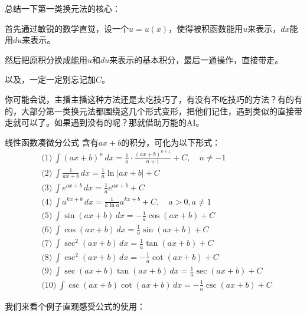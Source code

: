总结一下第一类换元法的核心：

首先通过敏锐的数学直觉，设一个$u=u(x)$，使得被积函数能用$u$来表示，$dx$能用$du$来表示。

然后把原积分换成能用$u$和$du$来表示的基本积分，最后一通操作，直接带走。

以及，一定一定别忘记加$C$。

你可能会说，主播主播这种方法还是太吃技巧了，有没有不吃技巧的方法？有的有的，大部分第一类换元法都围绕这几个形式变形，把他们记住，遇到类似的直接带走就可以了。如果遇到没有的呢？那就借助万能的AI。

\begin{theorem}{线性函数凑微分公式}{}
  含有$ax+b$的积分，可化为以下形式：
\[
\begin{aligned}
&\text{(1)}\ \int (ax+b)^n \,dx = \frac{1}{a}\cdot\frac{(ax+b)^{n+1}}{n+1}+C, \quad n\neq -1 \\[4pt]
&\text{(2)}\ \int \frac{1}{ax+b} \,dx = \frac{1}{a}\ln|ax+b|+C \\[4pt]
&\text{(3)}\ \int e^{ax+b} \,dx = \frac{1}{a}e^{ax+b}+C \\[4pt]
&\text{(4)}\ \int a^{kx+b} \,dx = \frac{1}{k\ln a}a^{kx+b}+C, \quad a>0,a\neq1 \\[4pt]
&\text{(5)}\ \int \sin(ax+b) \,dx = -\frac{1}{a}\cos(ax+b)+C \\[4pt]
&\text{(6)}\ \int \cos(ax+b) \,dx = \frac{1}{a}\sin(ax+b)+C \\[4pt]
&\text{(7)}\ \int \sec^2(ax+b) \,dx = \frac{1}{a}\tan(ax+b)+C \\[4pt]
&\text{(8)}\ \int \csc^2(ax+b) \,dx = -\frac{1}{a}\cot(ax+b)+C \\[4pt]
&\text{(9)}\ \int \sec(ax+b)\tan(ax+b) \,dx = \frac{1}{a}\sec(ax+b)+C \\[4pt]
&\text{(10)}\ \int \csc(ax+b)\cot(ax+b) \,dx = -\frac{1}{a}\csc(ax+b)+C
\end{aligned}
\]
\end{theorem}

我们来看个例子直观感受公式的使用：

